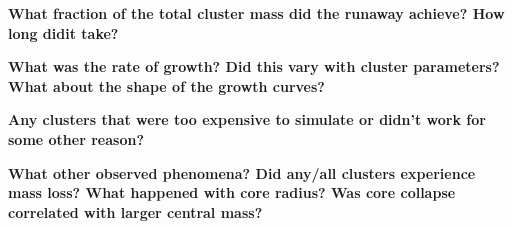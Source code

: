 \documentclass[preprint1]{aastex}
\numberwithin{equation}{section}
\begin{document}
\textbf{What fraction of the total cluster mass did the runaway achieve?  How long didit take?}

\textbf{What was the rate of growth?  Did this vary with cluster parameters?  What about the shape of the growth curves?}

\textbf{Any clusters that were too expensive to simulate or didn't work for some other reason?}

\textbf{What other observed phenomena?  Did any/all clusters experience mass loss?  What happened with core radius?  Was core collapse correlated with larger central mass?}





\end{document}
